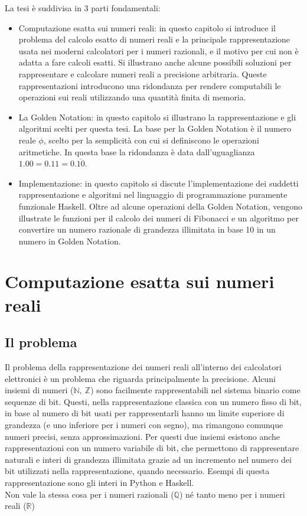 \documentclass[Lau,oneside]{sapthesis}
\begin{document}
La tesi è suddivisa in 3 parti fondamentali:
\begin{itemize}
\item Computazione esatta sui numeri reali: in questo capitolo si introduce il problema del calcolo esatto di numeri reali e la principale rappresentazione usata nei moderni calcolatori per i numeri razionali, e il motivo per cui non è adatta a fare calcoli esatti. Si illustrano anche alcune possibili soluzioni per rappresentare e calcolare numeri reali a precisione arbitraria. Queste rappresentazioni introducono una ridondanza per rendere computabili le operazioni sui reali utilizzando una quantità finita di memoria.
\item La Golden Notation: in questo capitolo si illustrano la rappresentazione e gli algoritmi scelti per questa tesi. La base per la Golden Notation è il numero reale $\phi$, scelto per la semplicità con cui si definiscono le operazioni aritmetiche. In questa base la ridondanza è data dall'uguaglianza $1.00 = 0.11 = 0.\overline{10}$.
\item Implementazione: in questo capitolo si discute l'implementazione dei suddetti rappresentazione e algoritmi nel linguaggio di programmazione puramente funzionale Haskell. Oltre ad alcune operazioni della Golden Notation, vengono illustrate le funzioni per il calcolo dei numeri di Fibonacci e un algoritmo per convertire un numero razionale di grandezza illimitata in base 10 in un numero in Golden Notation.
\end{itemize}



\chapter{Computazione esatta sui numeri reali}



\section{Il problema}
Il problema della rappresentazione dei numeri reali all'interno dei calcolatori elettronici è un problema che riguarda principalmente la precisione. Alcuni insiemi di numeri ($\mathbb{N},\ \mathbb{Z}$) sono 
facilmente rappresentabili nel sistema binario come sequenze di bit. Questi, nella rappresentazione classica con un numero fisso di bit, in 
base al numero di bit usati per rappresentarli hanno un limite superiore di 
grandezza (e uno inferiore per i numeri con segno), ma rimangono comunque numeri 
precisi, senza approssimazioni. Per questi due insiemi esistono anche rappresentazioni con un numero variabile di bit, che permettono di rappresentare naturali e interi di grandezza illimitata grazie ad un incremento nel numero dei bit utilizzati nella rappresentazione, quando necessario. Esempi di questa rappresentazione sono gli interi in Python e Haskell.\\Non vale la stessa cosa per i numeri razionali 
($\mathbb{Q}$) né tanto meno per i numeri reali ($\mathbb{R}$)
\end{document}
